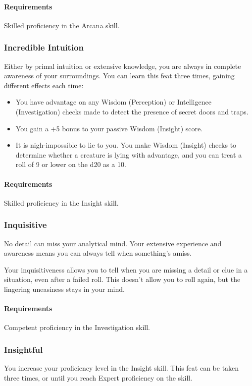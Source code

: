     \paragraph{Requirements} Skilled proficiency in the Arcana skill.
\subsubsection{Incredible Intuition} \label{feat::incredibleintuition}
    Either by primal intuition or extensive knowledge, you are always in complete awareness of your surroundings.
    You can learn this feat three times, gaining different effects each time:
    \begin{itemize}
        \item You have advantage on any Wisdom (Perception) or Intelligence (Investigation) checks made to detect the presence of secret doors and traps.
        \item You gain a +5 bonus to your passive Wisdom (Insight) score.
        \item It is nigh-impossible to lie to you.
        You make Wisdom (Insight) checks to determine whether a creature is lying with advantage, and you can treat a roll of 9 or lower on the d20 as a 10.
    \end{itemize}
    \paragraph{Requirements} Skilled proficiency in the Insight skill.
\subsubsection{Inquisitive} \label{feat::inquisitive}
    No detail can miss your analytical mind.
    Your extensive experience and awareness means you can always tell when something's amiss.

    Your inquisitiveness allows you to tell when you are missing a detail or clue in a situation, even after a failed roll.
    This doesn't allow you to roll again, but the lingering uneasiness stays in your mind.
    \paragraph{Requirements} Competent proficiency in the Investigation skill.
\subsubsection{Insightful} \label{feat::insightful}
    You increase your proficiency level in the Insight skill.
    This feat can be taken three times, or until you reach Expert proficiency on the skill.
